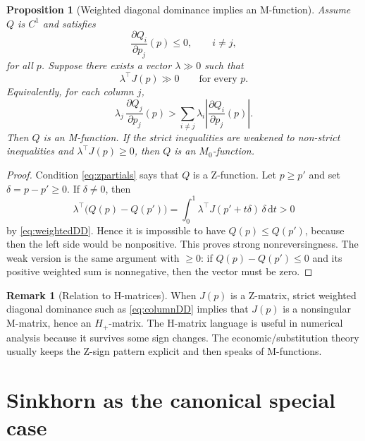 \documentclass[11pt]{article}
\newcommand{\dd}{\mathrm{d}}
\theoremstyle{definition}
\newtheorem{remark}[definition]{Remark}
\theoremstyle{plain}
\newtheorem{proposition}[definition]{Proposition}
\begin{document}
\begin{proposition}[Weighted diagonal dominance implies an M-function]\label{prop:H}
Assume $Q$ is $C^1$ and satisfies
\begin{equation}\label{eq:zpartials}
        \frac{\partial Q_i}{\partial p_j}(p)\leq0,
        \qquad i\neq j,
\end{equation}
for all $p$. Suppose there exists a vector $\lambda\gg0$ such that
\begin{equation}\label{eq:weightedDD}
        \lambda^\top J(p)\gg0
        \qquad\text{for every }p.
\end{equation}
Equivalently, for each column $j$,
\begin{equation}\label{eq:columnDD}
        \lambda_j\,\frac{\partial Q_j}{\partial p_j}(p)
        >
        \sum_{i\neq j}\lambda_i\left|\frac{\partial Q_i}{\partial p_j}(p)\right|.
\end{equation}
Then $Q$ is an M-function. If the strict inequalities are weakened to non-strict inequalities and $\lambda^\top J(p)\geq0$, then $Q$ is an $M_0$-function.
\end{proposition}

\begin{proof}
Condition \eqref{eq:zpartials} says that $Q$ is a Z-function. Let $p\geq p'$ and set $\delta=p-p'\geq0$. If $\delta\neq0$, then
\[
        \lambda^\top\bigl(Q(p)-Q(p')\bigr)
        =\int_0^1 \lambda^\top J(p'+t\delta)\,\delta\,\dd t
        >0
\]
by \eqref{eq:weightedDD}. Hence it is impossible to have $Q(p)\leq Q(p')$, because then the left side would be nonpositive. This proves strong nonreversingness. The weak version is the same argument with $\geq0$: if $Q(p)-Q(p')\leq0$ and its positive weighted sum is nonnegative, then the vector must be zero.
\end{proof}

\begin{remark}[Relation to H-matrices]
When $J(p)$ is a Z-matrix, strict weighted diagonal dominance such as \eqref{eq:columnDD} implies that $J(p)$ is a nonsingular M-matrix, hence an $H_+$-matrix. The H-matrix language is useful in numerical analysis because it survives some sign changes. The economic/substitution theory usually keeps the Z-sign pattern explicit and then speaks of M-functions.
\end{remark}

\section{Sinkhorn as the canonical special case}
\end{document}
